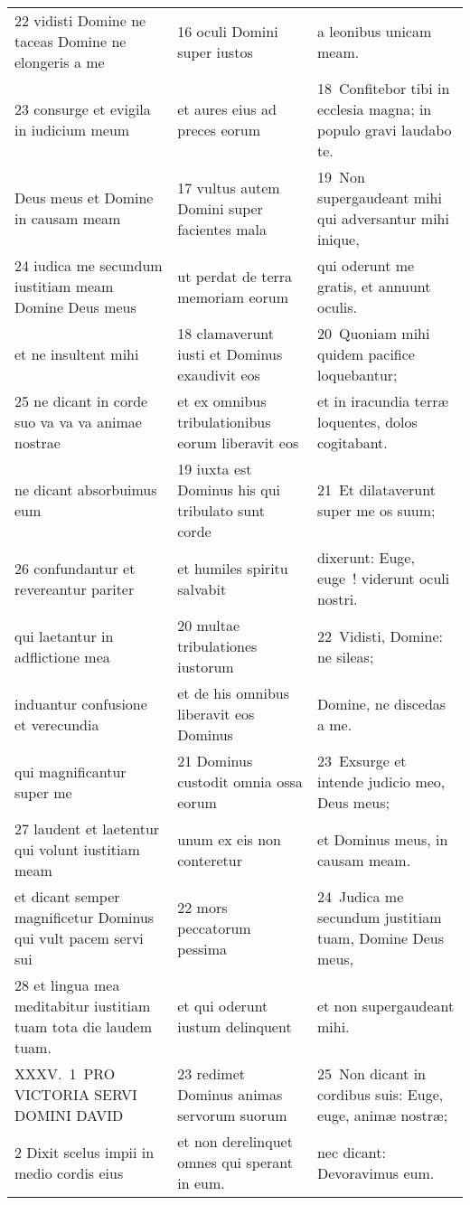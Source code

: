 \documentclass{article}
\begin{document}
\begin{longtable}{@{}p{}p{}p{}@{}}
22 vidisti Domine ne taceas Domine ne elongeris a me	&	16 oculi Domini super iustos	&	a leonibus unicam meam.	\\
23 consurge et evigila in iudicium meum	&	et aures eius ad preces eorum	&	18 Confitebor tibi in ecclesia magna; in populo gravi laudabo te.	\\
Deus meus et Domine in causam meam	&	17 vultus autem Domini super facientes mala	&	19 Non supergaudeant mihi qui adversantur mihi inique,	\\
24 iudica me secundum iustitiam meam Domine Deus meus	&	ut perdat de terra memoriam eorum	&	qui oderunt me gratis, et annuunt oculis.	\\
et ne insultent mihi	&	18 clamaverunt iusti et Dominus exaudivit eos	&	20 Quoniam mihi quidem pacifice loquebantur;	\\
25 ne dicant in corde suo va va va animae nostrae	&	et ex omnibus tribulationibus eorum liberavit eos	&	et in iracundia terræ loquentes, dolos cogitabant.	\\
ne dicant absorbuimus eum	&	19 iuxta est Dominus his qui tribulato sunt corde	&	21 Et dilataverunt super me os suum;	\\
26 confundantur et revereantur pariter	&	et humiles spiritu salvabit	&	dixerunt: Euge, euge ! viderunt oculi nostri.	\\
qui laetantur in adflictione mea	&	20 multae tribulationes iustorum	&	22 Vidisti, Domine: ne sileas;	\\
induantur confusione et verecundia	&	et de his omnibus liberavit eos Dominus	&	Domine, ne discedas a me.	\\
qui magnificantur super me	&	21 Dominus custodit omnia ossa eorum	&	23 Exsurge et intende judicio meo, Deus meus;	\\
27 laudent et laetentur qui volunt iustitiam meam	&	unum ex eis non conteretur	&	et Dominus meus, in causam meam.	\\
et dicant semper magnificetur Dominus qui vult pacem servi sui	&	22 mors peccatorum pessima	&	24 Judica me secundum justitiam tuam, Domine Deus meus,	\\
28 et lingua mea meditabitur iustitiam tuam tota die laudem tuam.	&	et qui oderunt iustum delinquent	&	et non supergaudeant mihi.	\\
XXXV. 1 PRO VICTORIA SERVI DOMINI DAVID	&	23 redimet Dominus animas servorum suorum	&	25 Non dicant in cordibus suis: Euge, euge, animæ nostræ;	\\
2 Dixit scelus impii in medio cordis eius	&	et non derelinquet omnes qui sperant in eum.	&	nec dicant: Devoravimus eum.	\\

\end{longtable}
\end{document}
